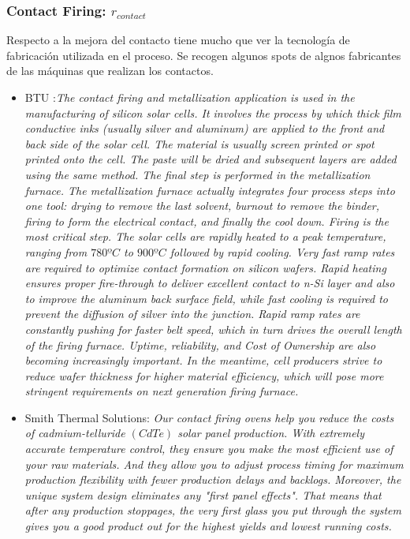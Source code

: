 \subsubsection{Contact Firing: $ r_{contact} $}
\label{u15.contactFiring}
Respecto a la mejora del contacto tiene mucho que ver la tecnología de fabricación utilizada en el proceso. Se recogen algunos spots de algnos fabricantes de las máquinas que realizan los contactos.
\begin{itemize}
	\item BTU :{\em The contact firing and metallization application is used in the manufacturing of silicon solar cells. It involves the process by which thick film conductive inks (usually silver and aluminum) are applied to the front and back side of the solar cell. The material is usually screen printed or spot printed onto the cell. The paste will be dried and subsequent layers are added using the same method. The final step is performed in the metallization furnace. The metallization furnace actually integrates four process steps into one tool: drying to remove the last solvent, burnout to remove the binder, firing to form the electrical contact, and finally the cool down. Firing is the most critical step. The solar cells are rapidly heated to a peak temperature, ranging from $ 780ºC $ to $ 900ºC $ followed by rapid cooling.	
		Very fast ramp rates are required to optimize contact formation on silicon wafers. Rapid heating ensures proper fire-through to deliver excellent contact to n-Si layer and also to improve the aluminum back surface field, while fast cooling is required to prevent the diffusion of silver into the junction. Rapid ramp rates are constantly pushing for faster belt speed, which in turn drives the overall length of the firing furnace. Uptime, reliability, and Cost of Ownership are also becoming increasingly important. In the meantime, cell producers strive to reduce wafer thickness for higher material efficiency, which will pose more stringent requirements on next generation firing furnace.}
	\item Smith Thermal Solutions: {\em Our contact firing ovens help you reduce the costs of cadmium-telluride $ (CdTe) $ solar panel production. With extremely accurate temperature control, they ensure you make the most efficient use of your raw materials. And they allow you to adjust process timing for maximum production flexibility with fewer production delays and backlogs. Moreover, the unique system design eliminates any "first panel effects". That means that after any production stoppages, the very first glass you put through the system gives you a good product out for the highest yields and lowest running costs.}	
\end{itemize}

